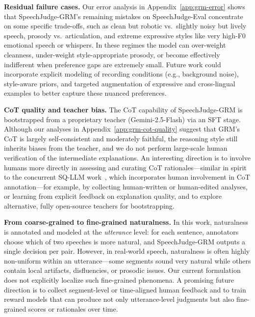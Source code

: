 \documentclass[]{bytedance_seed}
\begin{document}
\textbf{Residual failure cases.}\quad
Our error analysis in Appendix~\ref{app:grm-error} shows that SpeechJudge-GRM’s remaining
mistakes on {SpeechJudge-Eval} concentrate on
some specific trade-offs, such as clean but robotic vs.\ slightly noisy but lively speech,
prosody vs.\ articulation, and extreme expressive styles like very
high-F0 emotional speech or whispers.
In these regimes the model can over-weight cleanness, under-weight
style-appropriate prosody, or become effectively indifferent when preference
gaps are extremely small.
Future work could incorporate explicit modeling of recording conditions
(e.g., background noise), style-aware priors, and targeted augmentation of
expressive and cross-lingual examples to better capture these nuanced
preferences.

\textbf{CoT quality and teacher bias.}\quad
The CoT capability of SpeechJudge-GRM is bootstrapped from a proprietary
teacher (Gemini-2.5-Flash) via an SFT stage.
Although our analyses in Appendix~\ref{app:grm-cot-quality} suggest that GRM’s CoT is largely
self-consistent and moderately faithful,
the reasoning style still
inherits biases from the teacher, and we do not perform large-scale human
verification of the intermediate explanations.
An interesting direction is to involve humans more directly in assessing and curating CoT rationales—similar in spirit to the concurrent SQ-LLM work~\citep{sq-llm}, which incorporates human involvement in CoT annotation—for example, by collecting human-written or human-edited analyses, or learning from explicit feedback on explanation quality, and to explore alternative, fully open-source teachers for bootstrapping.


\textbf{From coarse-grained to fine-grained naturalness.}\quad
In this work, naturalness is annotated and modeled at the \textit{utterance}
level: for each sentence, annotators choose which of two speeches is more
natural, and SpeechJudge-GRM outputs a single decision per pair.
However, in real-world speech, naturalness is often highly non-uniform within
an utterance—some segments sound very natural while others contain local
artifacts, disfluencies, or prosodic issues.
Our current formulation does not explicitly localize such fine-grained
phenomena.
A promising future direction is to collect segment-level or time-aligned
human feedback and to train reward models that can produce not only
utterance-level judgments but also fine-grained scores or rationales over
time. 
\end{document}
